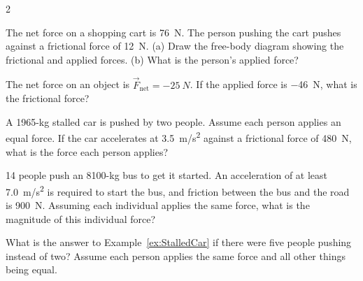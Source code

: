 \documentclass{article}
\numberwithin{equation}{section}
\numberwithin{figure}{section}
\begin{document}
\begin{multicols}{2}

\begin{exercise} \label{lqMcA5}
The net force on a shopping cart is \SI{76}{N}. The person pushing the cart pushes against a frictional force of \SI{12}{N}. (a) Draw the free-body diagram showing the frictional and applied forces. (b) What is the person's applied force?
\end{exercise}

\begin{exercise} \label{Og290b}
The net force on an object is $\vec{F}_{\text{net}} = \SI{-25}{N}$. If the applied force is \SI{-46}{N}, what is the frictional force? 
\end{exercise}

\begin{center}
\end{center}

\begin{exercise} \label{naDHpo}
A 1965-kg stalled car is pushed by two people. Assume each person applies an equal force. If the car accelerates at \SI{3.5}{m/s^2} against a frictional force of \SI{480}{N}, what is the force each person applies? 
\end{exercise}

\begin{exercise} \label{w6N0j0}
14 people push an 8100-kg bus to get it started. An acceleration of at least \SI{7.0}{m/s^2} is required to start the bus, and friction between the bus and the road is \SI{900}{N}. Assuming each individual applies the same force, what is the magnitude of this individual force?
\end{exercise}

\begin{exercise} \label{WHMhQG}
    What is the answer to Example~\ref{ex:StalledCar} if there were five people pushing instead of two? Assume each person applies the same force and all other things being equal.
\end{exercise}


\end{multicols}
\end{document}
